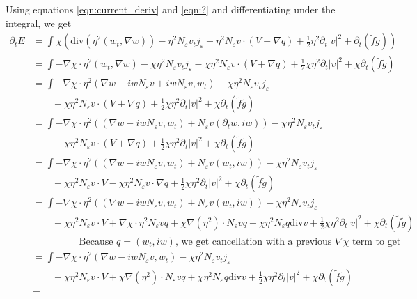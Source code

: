 \documentclass[a4paper]{article}
\renewcommand{\div}{\mathrm{div}}
\begin{document}
Using equations \eqref{eqn:current_deriv} and \eqref{eqn:?} and differentiating under the integral, we get
\begin{align}
  \partial_t E &= \int_{}^{} \chi \left( \div(\eta^2 (w_t, \nabla w)) - \eta^2 N_\varepsilon v_t j_\varepsilon - \eta^2 N_\varepsilon v \cdot (V + \nabla q) +
  \frac{1}{2} \eta^2 \partial_t |v|^2 + \partial_t (\tilde{f} \tilde{g}) \right) \nonumber \\
  &= \int - \nabla \chi \cdot \eta^2 (w_t, \nabla w) - \chi \eta^2 N_\varepsilon v_t j_\varepsilon - \chi \eta^2 N_\varepsilon v \cdot (V + \nabla q)
  + \frac{1}{2} \chi \eta^2 \partial_t |v|^2 + \chi \partial_t (\tilde{f} \tilde{g}) \nonumber \\
  &= \int - \nabla \chi \cdot \eta^2 ( \nabla w - i w N_\varepsilon v + i w N_\varepsilon v, w_t) - \chi \eta^2 N_\varepsilon v_t j_\varepsilon
  \nonumber \\
  &\quad \quad - \chi \eta^2 N_\varepsilon v \cdot (V + \nabla q) + \frac{1}{2} \chi \eta^2 \partial_t |v|^2 + \chi \partial_t(\tilde{f} \tilde{g}) \nonumber \\
  &= \int - \nabla \chi \cdot \eta^2 \left( (\nabla w - iw N_\varepsilon v, w_t) + N_\varepsilon v (\partial_t w, i w) \right) - \chi \eta^2
  N_\varepsilon v_t j_\varepsilon \nonumber \\
  &\quad \quad - \chi \eta^2 N_\varepsilon v \cdot (V+\nabla q) + \frac{1}{2} \chi \eta^2 \partial_t |v|^2 + \chi \partial_t(\tilde{f} \tilde{g}) \nonumber \\
  &= \int - \nabla \chi \cdot \eta^2 ( (\nabla w - iw N_\varepsilon v, w_t) + N_\varepsilon v(w_t, iw) ) - \chi \eta^2 N_\varepsilon v_t j_\varepsilon
  \nonumber \\
  &\quad \quad - \chi \eta^2 N_\varepsilon v \cdot V - \chi \eta^2 N_\varepsilon v \cdot \nabla q + \frac{1}{2} \chi \eta^2 \partial_t |v|^2 + \chi \partial_t( \tilde{f}
  \tilde{g}) \nonumber \\
  &= \int - \nabla \chi \cdot \eta^2 ( ( \nabla w - i w N_\varepsilon v, w_t) + N_\varepsilon v(w_t, iw) ) - \chi \eta^2 N_\varepsilon v_t
  j_\varepsilon \nonumber \\
  &\quad \quad - \chi \eta^2 N_\varepsilon v \cdot V + \nabla \chi \cdot \eta^2 N_\varepsilon v q + \chi \nabla(\eta^2) \cdot N_\varepsilon v q + \chi
  \eta^2 N_\varepsilon q \div v + \frac{1}{2} \chi \eta^2 \partial_t |v|^2 + \chi \partial_t (\tilde{f} \tilde{g}) \nonumber \\
  &\hspace{2cm} \text{Because } q = (w_t, iw) \text{, we get cancellation with a previous $\nabla \chi$ term to get} \nonumber \\
  &= \int - \nabla \chi \cdot \eta^2 ( \nabla w - iw N_\varepsilon v, w_t) - \chi \eta^2 N_\varepsilon v_t j_\varepsilon \nonumber \\
  &\quad \quad - \chi \eta^2 N_\varepsilon v \cdot V + \chi \nabla(\eta^2) \cdot N_\varepsilon vq + \chi \eta^2 N_\varepsilon q \div v +
  \frac{1}{2} \chi \eta^2 \partial_t |v|^2 + \chi \partial_t (\tilde{f} \tilde{g}) \nonumber \\
  &=
  \label{eqn:energy_deriv}
\end{align}
\end{document}
